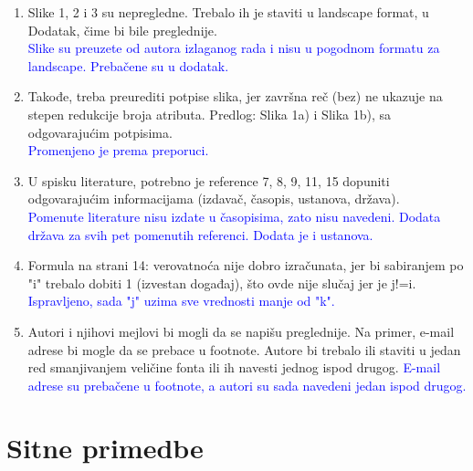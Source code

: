 \documentclass[a4paper]{report}
\newcommand{\odgovor}[1]{\textcolor{blue}{#1}}
\begin{document}
\begin{enumerate}
\item Slike 1, 2 i 3 su nepregledne.
Trebalo ih je staviti u landscape format, u Dodatak, čime bi bile preglednije.
\\\odgovor{Slike su preuzete od autora izlaganog rada i nisu u pogodnom formatu za landscape. Prebačene su u dodatak.}

\item Takođe, treba preurediti potpise slika,
jer završna reč (bez) ne ukazuje na stepen redukcije broja atributa.
Predlog:
Slika 1a) i Slika 1b), sa odgovarajućim potpisima.
\\\odgovor{Promenjeno je prema preporuci.}

\item U spisku literature, potrebno je reference 7, 8, 9, 11, 15
dopuniti odgovarajućim informacijama (izdavač, časopis, ustanova, država).
\\\odgovor{Pomenute literature nisu izdate u časopisima, zato nisu navedeni. Dodata država za svih pet pomenutih referenci. Dodata je i ustanova. }

\item Formula na strani 14: verovatnoća nije dobro izračunata,
jer bi sabiranjem po "i" trebalo dobiti 1 (izvestan događaj), što ovde nije slučaj jer je j!=i.
\\\odgovor{Ispravljeno, sada "j" uzima sve vrednosti manje od "k".}

\item Autori i njihovi mejlovi bi mogli da se napišu preglednije.
Na primer, e-mail adrese bi mogle da se prebace u footnote.
Autore bi trebalo ili staviti u jedan red smanjivanjem veličine fonta
ili ih navesti jednog ispod drugog.
\odgovor{E-mail adrese su prebačene u footnote, a autori su sada navedeni jedan ispod drugog.}
\end{enumerate}

\section{Sitne primedbe}
\end{document}
